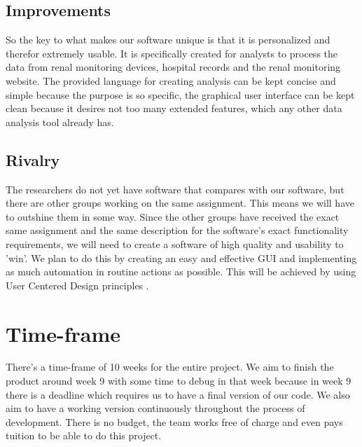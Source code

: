 \documentclass[a4paper]{article}
\begin{document}
\subsection{Improvements}
So the key to what makes our software unique is that it is personalized and therefor extremely usable. It is specifically created for analysts to process the data from renal monitoring devices, hospital records and the renal monitoring website. The provided language for creating analysis can be kept concise and simple because the purpose is so specific, the graphical user interface can be kept clean because it desires not too many extended features, which any other data analysis tool already has.

\subsection{Rivalry}
The researchers do not yet have software that compares with our software, but there are other groups working on the same assignment. This means we will have to outshine them in some way. Since the other groups have received the exact same assignment and the same description for the software's exact functionality requirements, we will need to create a software of high quality and usability to 'win'. We plan to do this by creating an easy and effective GUI and implementing as much automation in routine actions as possible. This will be achieved by using User Centered Design principles \cite{Nielsen}.

\section{Time-frame}
There's a time-frame of 10 weeks for the entire project. We aim to finish the product around week 9 with some time to debug in that week because in week 9 there is a deadline which requires us to have a final version of our code. We also aim to have a working version continuously throughout the process of development. There is no budget, the team works free of charge and even pays tuition to be able to do this project.



\end{document}

